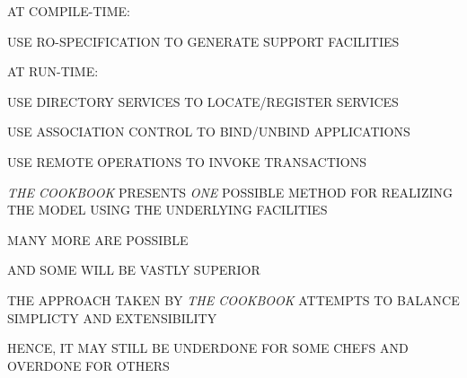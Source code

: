\begin{bwslide}

\begin{nrtc}
\item	AT COMPILE-TIME:
    \begin{nrtc}
    \item	USE RO-SPECIFICATION TO GENERATE SUPPORT FACILITIES
    \end{nrtc}

\item	AT RUN-TIME:
    \begin{nrtc}
    \item	USE DIRECTORY SERVICES TO LOCATE/REGISTER SERVICES

    \item	USE ASSOCIATION CONTROL TO BIND/UNBIND APPLICATIONS

    \item	USE REMOTE OPERATIONS TO INVOKE TRANSACTIONS
    \end{nrtc}
\end{nrtc}
\end{bwslide}






\begin{bwslide}

\begin{nrtc}
\item	\emph{THE COOKBOOK} PRESENTS \emph{ONE} POSSIBLE METHOD
	FOR REALIZING THE MODEL USING THE UNDERLYING FACILITIES

\item	MANY MORE ARE POSSIBLE\\
    \begin{nrtc}
    \item	AND SOME WILL BE VASTLY SUPERIOR
    \end{nrtc}

\item	THE APPROACH TAKEN BY \emph{THE COOKBOOK} ATTEMPTS TO BALANCE
	SIMPLICTY AND EXTENSIBILITY

\item	HENCE, IT MAY STILL BE UNDERDONE FOR SOME CHEFS AND OVERDONE FOR
	OTHERS
\end{nrtc}
\end{bwslide}
